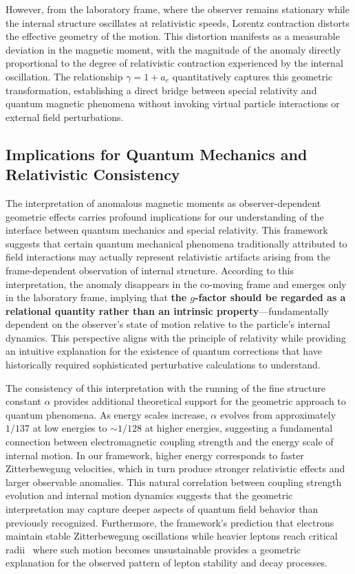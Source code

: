 \documentclass[%
 reprint,
 amsmath,amssymb,
 aps,
]{revtex4-1}
\numberwithin{equation}{section}%
\begin{document}
However, from the laboratory frame, where the observer remains stationary while the internal structure oscillates at relativistic speeds, Lorentz contraction distorts the effective geometry of the motion. This distortion manifests as a measurable deviation in the magnetic moment, with the magnitude of the anomaly directly proportional to the degree of relativistic contraction experienced by the internal oscillation. The relationship $\gamma = 1 + a_e$ quantitatively captures this geometric transformation, establishing a direct bridge between special relativity and quantum magnetic phenomena without invoking virtual particle interactions or external field perturbations.

\subsection{Implications for Quantum Mechanics and Relativistic Consistency}

The interpretation of anomalous magnetic moments as observer-dependent geometric effects carries profound implications for our understanding of the interface between quantum mechanics and special relativity. This framework suggests that certain quantum mechanical phenomena traditionally attributed to field interactions may actually represent relativistic artifacts arising from the frame-dependent observation of internal structure. According to this interpretation, the anomaly disappears in the co-moving frame and emerges only in the laboratory frame, implying that \textbf{the $g$-factor should be regarded as a relational quantity rather than an intrinsic property}---fundamentally dependent on the observer's state of motion relative to the particle's internal dynamics. This perspective aligns with the principle of relativity while providing an intuitive explanation for the existence of quantum corrections that have historically required sophisticated perturbative calculations to understand.

The consistency of this interpretation with the running of the fine structure constant $\alpha$ provides additional theoretical support for the geometric approach to quantum phenomena. As energy scales increase, $\alpha$ evolves from approximately $1/137$ at low energies to $\sim 1/128$ at higher energies, suggesting a fundamental connection between electromagnetic coupling strength and the energy scale of internal motion. In our framework, higher energy corresponds to faster Zitterbewegung velocities, which in turn produce stronger relativistic effects and larger observable anomalies. This natural correlation between coupling strength evolution and internal motion dynamics suggests that the geometric interpretation may capture deeper aspects of quantum field behavior than previously recognized. Furthermore, the framework's prediction that electrons maintain stable Zitterbewegung oscillations while heavier leptons reach critical radii~\cite{hanamura2501.0130} where such motion becomes unsustainable provides a geometric explanation for the observed pattern of lepton stability and decay processes.
\end{document}
